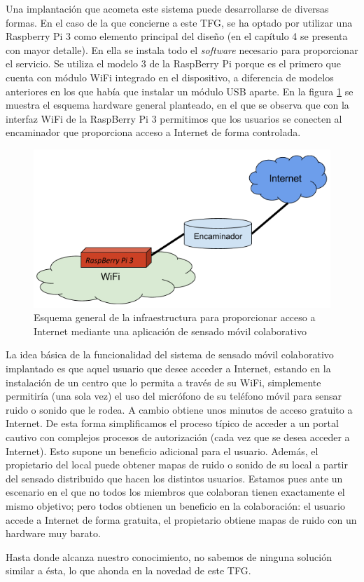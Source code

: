Una implantación que acometa este sistema puede desarrollarse de diversas formas. En el caso de la que concierne a este TFG, se ha optado por utilizar una Raspberry Pi 3 como elemento principal del diseño (en el capítulo 4 se presenta con mayor detalle). En ella se instala todo el \emph{software} necesario para proporcionar el servicio. Se utiliza el modelo 3 de la RaspBerry Pi porque es el primero que cuenta con módulo WiFi integrado en el dispositivo, a diferencia de modelos anteriores en los que había que instalar un módulo USB aparte. En la figura \ref{SystemScheme} se muestra el esquema hardware general planteado, en el que se observa que con la interfaz WiFi de la RaspBerry Pi 3 permitimos que los usuarios se conecten al encaminador que proporciona acceso a Internet de forma controlada.

\begin{figure}[!t]
\begin{center}
\includegraphics[width=0.75\linewidth]{./2_SensadoCol/Img/SystemScheme.png}
\end{center}
\caption{Esquema general de la infraestructura para proporcionar acceso a Internet mediante una aplicación de sensado móvil colaborativo}
\label{SystemScheme}
\end{figure}

La idea básica de la funcionalidad del sistema de sensado móvil colaborativo implantado es que aquel usuario que desee acceder a Internet, estando en la instalación de un centro que lo permita a través de su WiFi, simplemente permitiría (una sola vez) el uso del micrófono de su teléfono móvil para sensar ruido o sonido que le rodea. A cambio obtiene unos minutos de acceso gratuito a Internet. De esta forma simplificamos el proceso típico de acceder a un portal cautivo con complejos procesos de autorización (cada vez que se desea acceder a Internet). Esto supone un beneficio adicional para el usuario. Además, el propietario del local puede obtener mapas de ruido o sonido de su local a partir del sensado distribuido que hacen los distintos usuarios. Estamos pues ante un escenario en el que no todos los miembros que colaboran tienen exactamente el mismo objetivo; pero todos obtienen un beneficio en la colaboración: el usuario accede a Internet de forma gratuita, el propietario obtiene mapas de ruido con un hardware muy barato.

Hasta donde alcanza nuestro conocimiento, no sabemos de ninguna solución similar a ésta, lo que ahonda en la novedad de este TFG. 